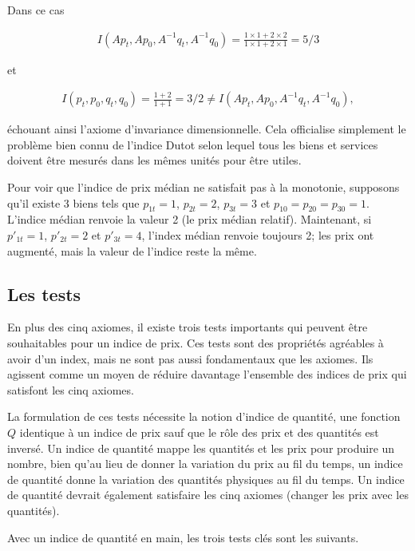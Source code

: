 \documentclass[
]{article}
\begin{document}
Dans ce cas

\begin{align*}
I(Ap_{t}, Ap_{0}, A^{- 1} q_{t}, A^{- 1} q_{0}) = \frac{1 \times 1 + 2 \times 2}{1 \times 1 + 2 \times 1} = 5/3
\end{align*}

et

\begin{align*}
I(p_{t}, p_{0}, q_{t}, q_{0}) = \frac{1 + 2}{1 + 1} = 3/2 \neq I(Ap_{t}, Ap_{0}, A^{-1} q_{t}, A^{-1} q_{0}),
\end{align*}

échouant ainsi l'axiome d'invariance dimensionnelle. Cela officialise simplement le problème bien connu de l'indice Dutot selon lequel tous les biens et services doivent être mesurés dans les mêmes unités pour être utiles.

Pour voir que l'indice de prix médian ne satisfait pas à la monotonie, supposons qu'il existe 3 biens tels que \(p_{1t} = 1\), \(p_{2t} = 2\), \(p_{3t} = 3\) et \(p_{10} = p_{20} = p_{30} = 1\). L'indice médian renvoie la valeur 2 (le prix médian relatif). Maintenant, si \(p'_{1t} = 1\), \(p' _{2t} = 2\) et \(p'_{3t} = 4\), l'index médian renvoie toujours 2; les prix ont augmenté, mais la valeur de l'indice reste la même.

\hypertarget{les-tests}{%
\subsection{Les tests}\label{les-tests}}

En plus des cinq axiomes, il existe trois tests importants qui peuvent être souhaitables pour un indice de prix. Ces tests sont des propriétés agréables à avoir d'un index, mais ne sont pas aussi fondamentaux que les axiomes. Ils agissent comme un moyen de réduire davantage l'ensemble des indices de prix qui satisfont les cinq axiomes.

La formulation de ces tests nécessite la notion d'indice de quantité, une fonction \(Q\) identique à un indice de prix sauf que le rôle des prix et des quantités est inversé. Un indice de quantité mappe les quantités et les prix pour produire un nombre, bien qu'au lieu de donner la variation du prix au fil du temps, un indice de quantité donne la variation des quantités physiques au fil du temps. Un indice de quantité devrait également satisfaire les cinq axiomes (changer les prix avec les quantités).

Avec un indice de quantité en main, les trois tests clés sont les suivants.
\end{document}
